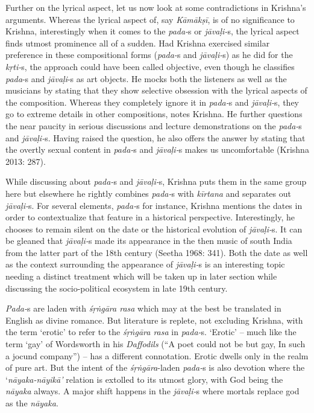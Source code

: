 {Further on the lyrical aspect, let us now look at some contradictions in Krishna’s arguments. Whereas the lyrical aspect of, say \textit{Kāmākṣī}, is of no significance to Krishna, interestingly when it comes to the \textit{pada-}s or \textit{jāvaḷi-}s, the lyrical aspect finds utmost prominence all of a sudden. Had Krishna exercised similar preference in these compositional forms (\textit{pada-}s and \textit{jāvaḷi-}s) as he did for the \textit{kṛti-}s, the approach could have been called objective, even though he classifies \textit{pada}-s and \textit{jāvaḷi}-s as art objects. He mocks both the listeners as well as the musicians by stating that they show selective obsession with the lyrical aspects of the composition. Whereas they completely ignore it in \textit{pada-}s and \textit{jāvaḷi-}s, they go to extreme details in other compositions, notes Krishna. He further questions the near paucity in serious discussions and lecture demonstrations on the \textit{pada-}s and \textit{jāvaḷi-}s. Having raised the question, he also offers the answer by stating that the overtly sexual content in \textit{pada-}s and \textit{jāvaḷi-}s makes us uncomfortable (Krishna 2013: 287).

While discussing about \textit{pada-}s and \textit{jāvaḷi-}s, Krishna puts them in the same group here but elsewhere he rightly combines \textit{pada-}s with \textit{kīrtana} and separates out \textit{jāvaḷi-}s. For several elements, \textit{pada-}s for instance, Krishna mentions the dates in order to contextualize that feature in a historical perspective. Interestingly, he chooses to remain silent on the date or the historical evolution of \textit{jāvaḷi-}s. It can be gleaned that \textit{jāvaḷi-}s made its appearance in the then music of south India from the latter part of the 18th century (Seetha 1968: 341). Both the date as well as the context surrounding the appearance of \textit{jāvaḷi-}s is an interesting topic needing a distinct treatment which will be taken up in later section while discussing the socio-political ecosystem in late 19th century.

\textit{Pada-}s are laden with \textit{śṛṅgāra rasa} which may at the best be translated in English as divine romance. But literature is replete, not excluding Krishna, with the term ‘erotic’ to refer to the \textit{śṛṅgāra rasa} in \textit{pada-}s. ‘Erotic’ – much like the term ‘gay’ of Wordsworth in his \textit{Daffodils} (“A poet could not be but gay, In such a jocund company”) – has a different connotation. Erotic dwells only in the realm of pure art. But the intent of the \textit{śṛṅgāra}-laden \textit{pada-}s is also devotion where the ‘\textit{nāyaka-nāyikā’} relation is extolled to its utmost glory, with God being the \textit{nāyaka} always. A major shift happens in the \textit{jāvaḷi-}s where mortals replace god as the \textit{nāyaka}.

}
